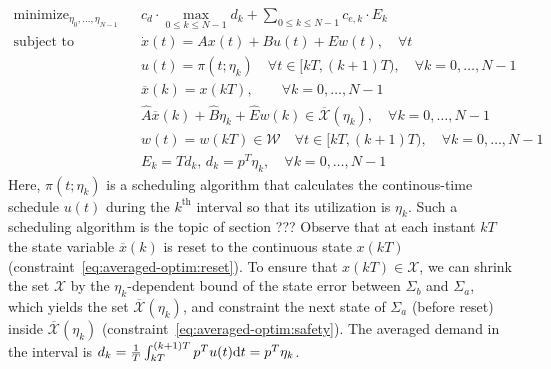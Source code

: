 \begin{eqnarray}
  \mathrm{minimize}_{\eta_0, \ldots, \eta_{N - 1}} &  & c_d \cdot \max_{0
  \leqslant k \leqslant N - 1} d_k + \sum_{0 \leqslant k \leqslant N - 1}
  c_{e, k} \cdot E_k  \label{eq:averaged-optim}\\
  \text{subject to} &  & \dot{x} (t) = Ax (t) + Bu (t) + Ew (t), \hspace{1em}
  \forall t \nonumber\\
  &  & u (t) = \pi (t ; \eta_k) \hspace{1em} \forall t \in [kT, (k + 1) T),
  \hspace{1em} \forall k = 0, \ldots, N - 1 \nonumber\\
  &  & \overbar{x} (k) = x (kT), \hspace{2em} \forall k = 0, \ldots, N - 1 
  \label{eq:averaged-optim:reset}\\
  &  & \hat{A}  \overbar{x} (k) + \hat{B} \eta_k + \hat{E} w (k) \in
  \overbar{\mathcal{X}} (\eta_k), \hspace{1em} \forall k = 0, \ldots, N - 1 
  \label{eq:averaged-optim:safety}\\
  &  & w (t) = w (kT) \in \mathcal{W} \hspace{1em} \forall t \in [kT, (k + 1)
  T), \hspace{1em} \forall k = 0, \ldots, N - 1 \nonumber\\
  &  & E_k = Td_k, \, d_k = p^T \eta_k, \hspace{1em} \forall k = 0, \ldots, N
  - 1 \nonumber
\end{eqnarray}
Here, $\pi (t ; \eta_k)$ is a scheduling algorithm that calculates the
continous-time schedule $u (t)$ during the $k^{\text{th}}$ interval so that
its utilization is $\eta_k$. Such a scheduling algorithm is the topic of
section ???  Observe that at each instant $kT$ the
state variable $\overbar{x} (k)$ is reset to the continuous state $x (kT)$
(constraint~\eqref{eq:averaged-optim:reset}). To ensure that $x (kT) \in
\mathcal{X}$, we can shrink the set $\mathcal{X}$ by the $\eta_k$-dependent
bound of the state error between $\Sigma_b$ and $\Sigma_a$, which yields the
set $\overbar{\mathcal{X}} (\eta_k)$, and constraint the next state of
$\Sigma_a$ (before reset) inside $\overbar{\mathcal{X}} (\eta_k)$
(constraint~\eqref{eq:averaged-optim:safety}).
The averaged demand in the interval is $d_k =
\frac{1}{T} \int_{kT}^{(k + 1) T} p^T u (t) \mathrm{d} t = p^T \eta_k$.



